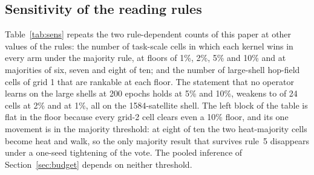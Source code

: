 \documentclass[preprint,11pt,3p]{elsarticle}
\begin{document}
\begin{table}[htbp]
\centering
\caption{Seam-cut graph, MAE: the pooled form of rule~6, one test per (task, shell), with the
columns of Table~\ref{tab:pooled}.}
\label{tab:seampooled}

\end{table}

\begin{table}[htbp]
\centering
\caption{Seam-cut graph, far-node error: the pooled form of rule~6, one test per (task, shell),
with the columns of Table~\ref{tab:pooled}.}
\label{tab:seampooledaurc}

\end{table}


\subsection{Sensitivity of the reading rules}
\label{sec:sens}

Table~\ref{tab:sens} repeats the two rule-dependent counts of this paper at other values of the
rules: the number of task-scale cells in which each kernel wins in every arm under the majority
rule, at floors of 1\%, 2\%, 5\% and 10\% and at majorities of six, seven and eight of ten; and
the number of large-shell hop-field cells of grid 1 that are rankable at each floor. The
statement that no operator learns on the large shells at 200 epochs holds at 5\% and 10\%, weakens
to \numRankableLargeAtGTwo{} of 24 cells at 2\% and \numRankableLargeAtGOne{} at 1\%, all on the
1584-satellite shell. The left block of the table is flat in the floor because every grid-2 cell
clears even a 10\% floor, and its one movement is in the majority threshold: at eight of ten the
two heat-majority cells become \numRobustHeatAtMajEight{} heat and \numRobustWalkAtMajEight{}
walk, so the only majority result that survives rule~5 disappears under a one-seed tightening of
the vote. The pooled inference of Section~\ref{sec:budget} depends on neither threshold.

\begin{table}[htbp]
\centering
\caption{Sensitivity of the rule-dependent counts to the floor threshold $g$ and the majority
threshold. Left: task-scale cells of grid 2 in which the heat / walk kernel wins in every arm
under rule~4 at the given majority. Right: hop-field cells of grid 1 at 1584 satellites and above
that are rankable at the given floor.}
\label{tab:sens}

\end{table}
\end{document}
